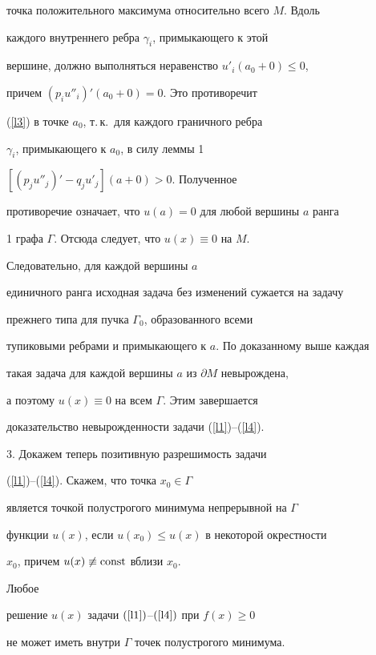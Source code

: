 {{{{{{{точка положительного максимума относительно всего $M$. Вдоль


каждого внутреннего ребра $\gamma_i$, примыкающего к этой


вершине, должно выполняться неравенство $u'_{i}(a_0+0) \leq 0$,


причем $(p_iu''_{i})'(a_0+0)=0$. Это противоречит


(\ref{l3}) в точке $a_0$, т.\,к.~для каждого граничного ребра


$\gamma_i$, примыкающего к $a_0$, в силу леммы 1\;


$[(p_j u''_{j})'-q_ju'_{j}](a+0)>0$. Полученное


противоречие означает, что $u(a) = 0$ для любой вершины $a$ ранга


1 графа $\Gamma$. Отсюда следует, что $u(x)\equiv 0$ на $M$.


Следовательно, для каждой вершины $a$


единичного ранга исходная задача без изменений сужается на задачу


прежнего типа для пучка $\Gamma_0$, образованного всеми


тупиковыми ребрами и примыкающего к $a$. По доказанному выше каждая


такая задача для каждой вершины $a$ из $\partial M$ невырождена,


а поэтому $u(x)\equiv 0$ на всем $\Gamma$. Этим завершается


доказательство невырожденности задачи (\ref{l1})--(\ref{l4}).


\medskip





3. Докажем теперь позитивную разрешимость задачи


(\ref{l1})--(\ref{l4}). Скажем, что точка $x_0 \in \Gamma$


является точкой полустрогого минимума непрерывной на $\Gamma$


функции $u(x)$, если $u(x_0)\leq u(x)$ в некоторой окрестности


$x_0$, причем $u(x)\not\equiv\operatorname{const}$ вблизи $x_0$.





\begin{lem} Любое


решение $u(x)$ задачи $(\ref{l1})$--$(\ref{l4})$ при $f(x)\geq 0$


не может иметь внутри $\Gamma$ точек полустрогого минимума.



\end{lem}}}}}}}}
